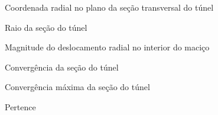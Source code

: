 \item[$ r $]			Coordenada radial no plano da seção transversal do túnel
\item[$ R $]			Raio da seção do túnel
\item[$ u(r) $] 		Magnitude do deslocamento radial no interior do maciço
\item[$ U $] 			Convergência da seção do túnel
\item[$ U_{max} $] 		Convergência máxima da seção do túnel
\item[$ \in $] Pertence